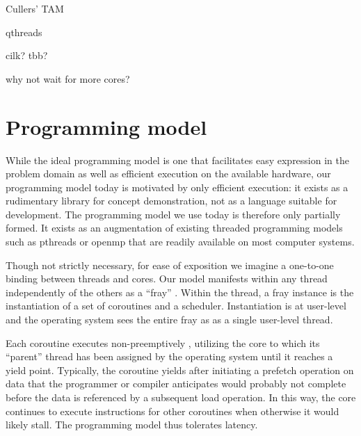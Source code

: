 \documentclass{acm_proc_article-sp}
\begin{document}
Cullers' TAM

qthreads

cilk? tbb?

why not wait for more cores?



\section{Programming model}
\label{sec:model}


While the ideal programming model is one that facilitates easy
expression in the problem domain as well as efficient execution on the
available hardware, our programming model today is motivated by only
efficient execution: it exists as a rudimentary library for concept
demonstration, not as a language suitable for development.  The
programming model we use today is therefore only partially formed. It
exists as an augmentation of existing threaded programming models such
as pthreads or openmp that are readily available on most computer
systems.

Though not strictly necessary, for ease of exposition we imagine a
one-to-one binding between threads and cores.  Our model manifests
within any thread independently of the others as a ``fray'' .  Within the thread, a fray instance is the
instantiation of a set of coroutines and a scheduler.  Instantiation
is at user-level and the operating system sees the entire fray as as a
single user-level thread.


Each coroutine executes non-preemptively , utilizing the core to which
its ``parent'' thread has been assigned by the operating system until it
reaches a yield point.  Typically, the coroutine yields after
initiating a prefetch operation on data that the programmer or
compiler anticipates would probably not complete before the data is
referenced by a subsequent load operation.  In this way, the core
continues to execute instructions for other coroutines when otherwise
it would likely stall.  The programming model thus tolerates latency.
\end{document}
